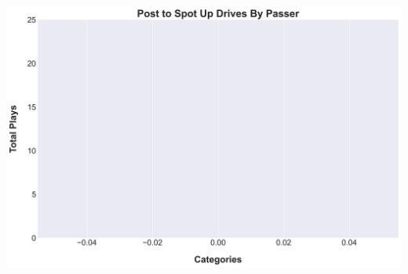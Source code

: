 \documentclass[a4paper,12pt]{article}
\begin{document}
\begin{table}[H]
{\begin{minipage}[t]{0.6\textwidth}
{\begin{tabular}
                
            
                
            
                
            
                
            
                
            
                
            
                
            
                
            
                
                    
                
            
                
            
                
            
                
            
                
            
                
            
                
            
                
            
                
            
                
            

            \bottomrule
        \end{tabular}
        } %
    \end{minipage}
    } %
    \hfill %
    \begin{minipage}[c]{0.35\textwidth} %
        \flushright
        \includegraphics[width=\textwidth, height=.14\textheight]{images/SpotUp_PostDrivesPlayer_Freq.png} %
    \end{minipage}
\end{table}
\end{document}
